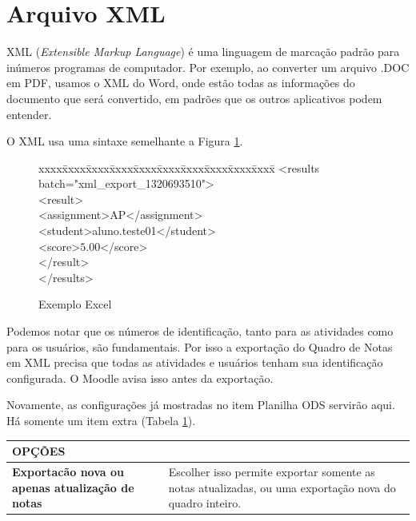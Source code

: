 \section{Arquivo XML}
XML (\textit{Extensible Markup Language}) é uma linguagem de marcação padrão para inúmeros programas de computador. Por exemplo, ao converter um arquivo .DOC em PDF, usamos o XML do Word, onde estão todas as informações do documento que será convertido, em padrões que os outros aplicativos podem entender.

O XML usa uma sintaxe semelhante a Figura \ref{fig:xml}.

\begin{figure}[!htbp]
 \small
 \begin{center}
 \begin{tabbing}
   xxxx\=xxxx\=xxxx\=xxxx\=xxxx\=xxxx\=xxxx\=xxxx\=xxxx\=xxxx\= \kill
	<results batch="xml\_export\_1320693510">\\
    	\> <result>\\
    		\>\> <assignment>AP</assignment>\\
    		\>\> <student>aluno.teste01</student>\\
    		\>\> <score>$5.00$</score>\\
    	\> </result>\\
    </results>\\
  \end{tabbing}
 \end{center}  
 \caption{Exemplo Excel}
\label{fig:xml}
\end{figure}


Podemos notar que os números de identificação, tanto para as atividades como para os usuários, são fundamentais. Por isso a exportação do Quadro de Notas em XML precisa que todas as atividades e usuários tenham sua identificação configurada. O Moodle avisa isso antes da exportação.

Novamente, as configurações já mostradas no item Planilha ODS servirão aqui. Há somente um item extra (Tabela \ref{tab:XML}).

\begin{table}[htbp]
\begin{flushleft}
    \begin{tabular}{p{6cm}|p{9cm}} \hline
    \rowcolor[rgb]{0.8,0.8,0.8} \textbf{OPÇÕES} &  \\\hline
    \textbf{Exportacão nova ou apenas atualização de notas} & Escolher isso permite exportar somente as notas atualizadas, ou uma exportação nova do quadro inteiro. \\\hline

\end{tabular}
  \label{tab:XML}
  \end{flushleft}
\end{table}%

